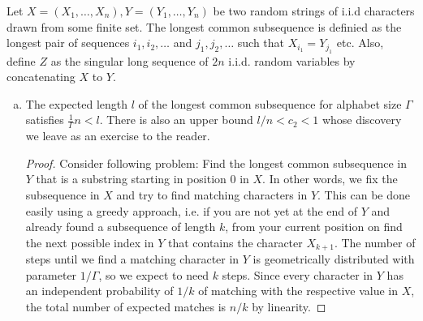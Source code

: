 \begin{aufgabe}
    Let $X=(X_1,\dots, X_n), Y=(Y_1,\dots,Y_n)$ be two random strings of i.i.d characters drawn from some finite set.
    The longest common subsequence is definied as the longest pair of sequences $i_1,i_2,\dots$ and $j_1,j_2,\dots$ such that $X_{i_1}=Y_{j_1}$ etc.
    Also, define $Z$ as the singular long sequence of $2n$ i.i.d. random variables by concatenating $X$ to $Y$.
    \begin{enumerate}[(a)]
        \item The expected length $l$ of the longest common subsequence for alphabet size $\Gamma$ satisfies $\frac{1}{\Gamma}n < l$.
              There is also an upper bound $l/n < c_2 < 1$ whose discovery we leave as an exercise to the reader.
              \begin{proof}
                  Consider following problem: Find the longest common subsequence in $Y$ that is a substring starting in position $0$ in $X$.
                  In other words, we fix the subsequence in $X$ and try to find matching characters in $Y$.
                  This can be done easily using a greedy approach, i.e. if you are not yet at the end of $Y$ and already found a subsequence of length $k$, from your current position on find the next possible index in $Y$ that contains the character $X_{k+1}$.
                  The number of steps until we find a matching character in $Y$ is geometrically distributed with parameter $1/\Gamma$, so we expect to need $k$ steps.
                  Since every character in $Y$ has an independent probability of $1/k$ of matching with the respective value in $X$, the total number of expected matches is $n/k$ by linearity.


\end{proof}
\end{enumerate}
\end{aufgabe}
